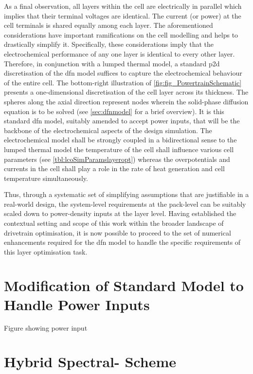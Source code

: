 As a final observation, all layers  within the cell are electrically in parallel
which implies that their terminal voltages are identical. The current (or power)
at the  cell terminals is  shared equally  among each layer.  The aforementioned
considerations have important  ramifications on the cell modelling  and helps to
drastically  simplify  it. Specifically,  these  considerations  imply that  the
electrochemical  performance  of any  one  layer  is  identical to  every  other
layer.  Therefore,  in conjunction  with  a  lumped  thermal model,  a  standard
\gls{p2d}  discretisation  of  the  \gls{dfn}  model  suffices  to  capture  the
electrochemical behaviour of  the entire cell. The  bottom-right illustration of
\cref{fig:fig_PowertrainSchematic} presents a  one-dimensional discretisation of
the  cell layer  across its  thickness. The  spheres along  the axial  direction
represent nodes wherein the solid-phase diffusion  equation is to be solved (see
\cref{sec:dfnmodel} for a brief overview).  It is this standard \gls{dfn} model,
suitably  amended to  accept power  inputs,  that will  be the  backbone of  the
electrochemical  aspects of  the  design simulation.  The electrochemical  model
shall be strongly  coupled in a bidirectional sense to  the lumped thermal model
\ie{} the temperature  of the cell shall influence various  cell parameters (see
\cref{tbl:lcoSimParamslayeropt}) whereas the overpotentials  and currents in the
cell shall  play a  role in  the rate  of heat  generation and  cell temperature
simultaneously.

Thus, through a  systematic set of simplifying assumptions  that are justifiable
in a real-world  design, the system-level requirements at the  pack-level can be
suitably  scaled  down  to  power-density  inputs at  the  layer  level.  Having
established the  contextual setting and  scope of  this work within  the broader
landscape of drivetrain  optimisation, it is now possible to  proceed to the set
of  numerical  enhancements required  for  the  \gls{dfn}  model to  handle  the
specific requirements of this layer optimisation task.

\section{Modification of Standard  Model to Handle Power Inputs}\label{sec:innatepowerinput}

Figure showing power input
\section{Hybrid Spectral- Scheme}\label{sec:hybridfv-spectral}

